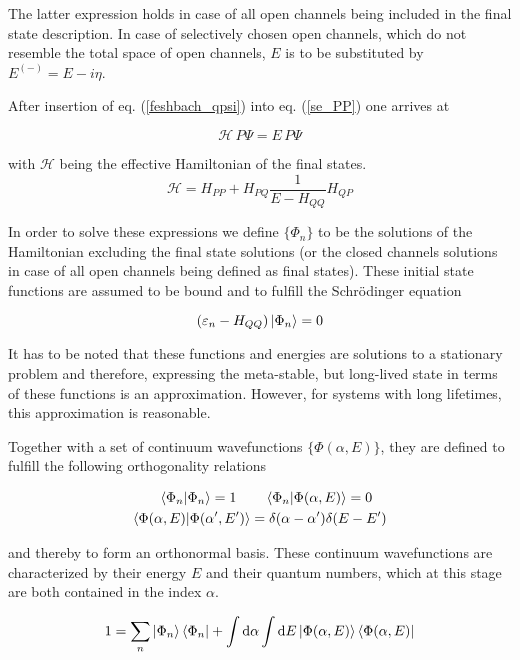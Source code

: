 The latter expression holds in case of all open channels being included
in the final state description.
In case of selectively chosen open channels, which do not resemble the total
space of open channels,
$E$ is to be substituted by $E^{(-)}=E - i\eta$.

After insertion of eq. (\ref{feshbach_qpsi}) into eq. (\ref{se_PP}) one arrives at

\begin{equation}
  \mathscr{H} \,P \Psi = E \,P \Psi \label{se_ppsi}
\end{equation}

with $\mathscr{H}$ being the effective Hamiltonian of the final states.
\begin{equation}
  \mathscr{H} = H_{PP} + H_{PQ} \frac{1}{E-H_{QQ}} H_{QP}
\end{equation}

In order to solve these expressions we define $\{\Phi_n\}$ to be the solutions
of the Hamiltonian excluding the final state solutions (or the closed channels
solutions in case of all open channels being defined as final states).
These initial state functions are assumed to be bound and to fulfill the
Schrödinger equation

\begin{equation}
  (\varepsilon_n - H_{QQ}) \ket{\Phi_n} = 0 
\end{equation}

It has to be noted that these functions and energies are solutions to a stationary
problem and therefore, expressing the meta-stable, but long-lived state
in terms of these functions is an approximation. However, for systems
with long lifetimes, this approximation is reasonable.

Together with a set of continuum wavefunctions $\{\Phi(\alpha,E)\}$, they are
defined to fulfill the following orthogonality relations

\begin{align}
  \braket{\Phi_n|\Phi_n} = 1 \quad  & \quad \braket{\Phi_n|\Phi(\alpha,E)} = 0\\
  \braket{\Phi(\alpha,E)|\Phi(\alpha',E')} & = \delta(\alpha-\alpha') \delta(E-E')
\end{align}

and thereby to form an orthonormal basis. These continuum wavefunctions
are characterized
by their energy $E$ and their quantum numbers, which at this stage are both
contained
in the index $\alpha$.

\begin{equation}
  1 = \sum\limits_n \ket{\Phi_n}\bra{\Phi_n} + \int \mathrm{d}\alpha \int \mathrm{d}E
      \ket{\Phi(\alpha,E)}\bra{\Phi(\alpha,E)} \label{feshbach_1}
\end{equation}

